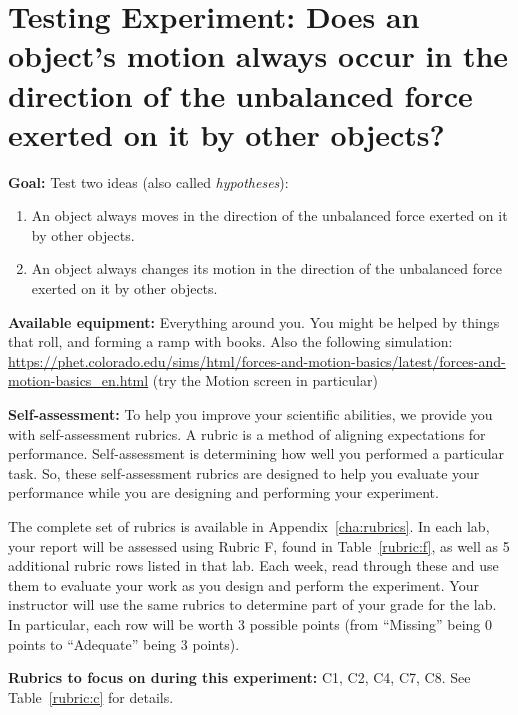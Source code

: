 \section{Testing Experiment: Does an object’s motion always	occur in the direction of the unbalanced force exerted on it by other objects?}

\textbf{Goal:} Test two ideas (also called \textit{hypotheses}):
\begin{enumerate}[label=(\alph*)]
	\item An object always moves in the direction of the unbalanced force exerted on it by other objects.
	\item An object always changes its motion in the direction of the unbalanced force exerted on it by other objects.
\end{enumerate}

\textbf{Available equipment:} Everything around you. You might be helped by things that roll, and forming a ramp with books. Also the following simulation: \url{https://phet.colorado.edu/sims/html/forces-and-motion-basics/latest/forces-and-motion-basics_en.html} (try the Motion screen in particular)

\begin{framed}
	\textbf{Self-assessment:} To help you improve your scientific abilities, we provide you with self-assessment rubrics.
	A rubric is a method of aligning expectations for performance.
	Self-assessment is determining how well you performed a particular task.
	So, these self-assessment rubrics are designed to help you evaluate your performance while you are designing and performing your experiment.
	
	The complete set of rubrics is available in Appendix~\ref{cha:rubrics}.
		In each lab, your report will be assessed using Rubric F, found in Table~\ref{rubric:f}, as well as 5 additional rubric rows listed in that lab.
		Each week, read through these and use them to evaluate your work as you design and perform the experiment.
		Your instructor will use the same rubrics to determine part of your grade for the lab. In particular, each row will be worth 3 possible points (from ``Missing'' being 0 points to ``Adequate'' being 3 points).
\end{framed}

\textbf{Rubrics to focus on during this experiment:} C1, C2, C4, C7, C8. See Table~\ref{rubric:c} for details.

